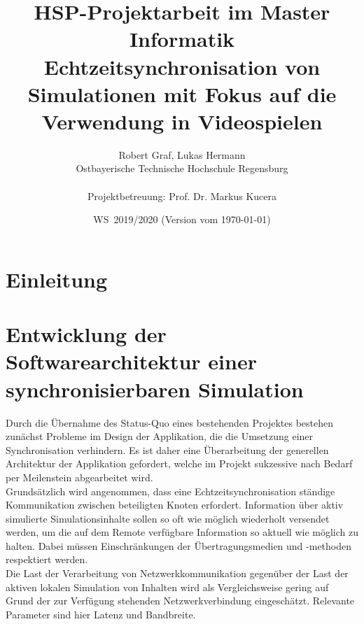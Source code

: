 \documentclass[11pt,twoside,a4paper]{article}
\begin{document}
\title{HSP-Projektarbeit im Master Informatik \\
\small Echtzeitsynchronisation von Simulationen mit Fokus auf die Verwendung in Videospielen}
\author{Robert Graf, Lukas Hermann\\
  Ostbayerische Technische Hochschule Regensburg\\
  \\
  Projektbetreuung: Prof. Dr. Markus Kucera
}
  
\date{WS\, 2019/2020 (Version vom \today)}

\maketitle

\newpage
\tableofcontents
\newpage



\section{Einleitung}


\section{Entwicklung der Softwarearchitektur einer synchronisierbaren Simulation}
Durch die Übernahme des Status-Quo eines bestehenden Projektes bestehen zunächst Probleme im Design der Applikation, die die Umsetzung einer Synchronisation verhindern. Es ist daher eine Überarbeitung der generellen Architektur der Applikation gefordert, welche im Projekt sukzessive nach Bedarf per Meilenstein abgearbeitet wird.\\
Grundsätzlich wird angenommen, dass eine Echtzeitsynchronisation ständige Kommunikation zwischen beteiligten Knoten erfordert.
Information über aktiv simulierte Simulationsinhalte sollen so oft wie möglich wiederholt versendet werden, um die auf dem Remote verfügbare Information so aktuell wie möglich zu halten. Dabei müssen Einschränkungen der Übertragungsmedien und -methoden respektiert werden.\\
Die Last der Verarbeitung von Netzwerkkommunikation gegenüber der Last der aktiven lokalen Simulation von Inhalten wird als Vergleichsweise gering auf Grund der zur Verfügung stehenden Netzwerkverbindung eingeschätzt. Relevante Parameter sind hier Latenz und Bandbreite.
\end{document}
